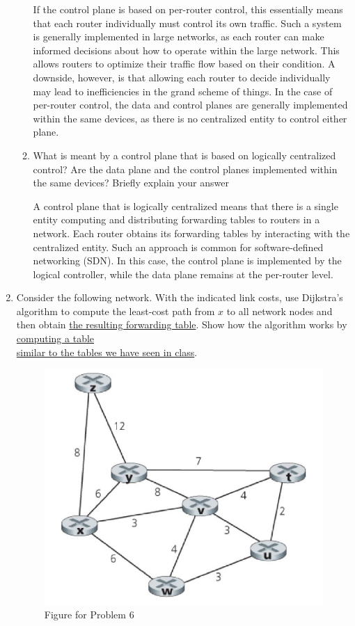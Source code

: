 \begin{enumerate}
\begin{enumerate}
        If the control plane is based on per-router control, this essentially means that each router individually must control its own traffic. Such a system is generally implemented in large networks, as each router can make informed decisions about how to operate within the large network. This allows routers to optimize their traffic flow based on their condition. A downside, however, is that allowing each router to decide individually may lead to inefficiencies in the grand scheme of things. In the case of per-router control, the data and control planes are generally implemented within the same devices, as there is no centralized entity to control either plane.

      \item What is meant by a control plane that is based on logically centralized control? Are the data plane and the control planes implemented within the same devices? Briefly explain your answer

        A control plane that is logically centralized means that there is a single entity computing and distributing forwarding tables to routers in a network. Each router obtains its forwarding tables by interacting with the centralized entity. Such an approach is common for software-defined networking (SDN). In this case, the control plane is implemented by the logical controller, while the data plane remains at the per-router level.
        
    \end{enumerate}

  \item Consider the following network. With the indicated link costs, use Dijkstra’s algorithm to compute the least-cost path from $x$ to all network nodes and then obtain \underline{the resulting forwarding table}. Show how the algorithm works by \underline{computing a table }\\\underline{similar to the tables we have seen in class}.

    \begin{figure}[H]
      \centering
      \includegraphics[width=.6\textwidth]{Figures/Djikstra.png}
      \caption{Figure for Problem 6}
      \label{fig:1}
    \end{figure}


\end{enumerate}
